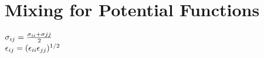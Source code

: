 \section{Mixing for Potential Functions}
\begin{mdframed}
    \vspace*{\baselineskip}
    \centering
    $\molecrad_{ij} = \frac{\molecrad_{ii}+\molecrad{jj}}{2}$\\
    
    $\dielec_{ij} = (\dielec_{ii}\dielec_{jj})^{1/2} $\\
 
\end{mdframed}